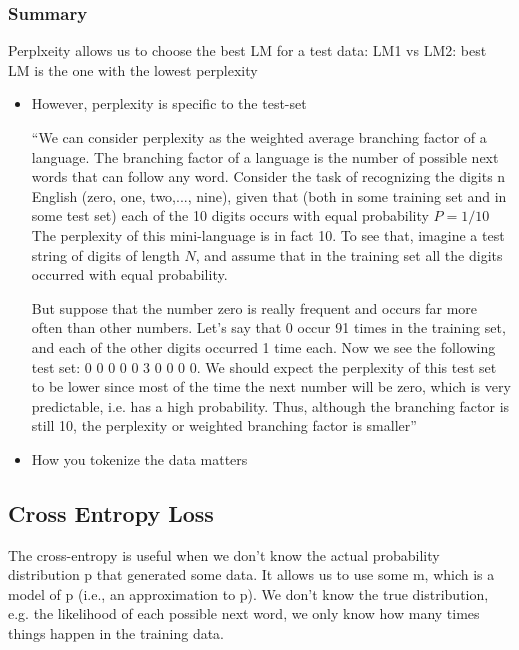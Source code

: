 \documentclass[11pt]{article}
\begin{document}
\subsubsection{Summary}

Perplxeity allows us to choose the best LM for a test data: LM1 vs LM2: best LM is the one with the lowest perplexity
\begin{itemize}
    \item However, perplexity is specific to the test-set
    
    ``We can consider perplexity as the weighted average branching factor of a language. The branching factor of a language is the number of possible next words that can follow any word. Consider the task of recognizing the digits n English (zero, one, two,..., nine), given that (both in some training set and in some test set) each of the 10 digits occurs with equal probability $P=1/10$  The perplexity of this mini-language is in fact 10. To see that, imagine a test string of digits of length $N$, and assume that in the training set all the digits occurred with equal probability. \label{content:weighted-average-branching-factor}

    But suppose that the number zero is really frequent and occurs far more often than other numbers. Let’s say that 0 occur 91 times in the training set, and each of the other digits occurred 1 time each. Now we see the following test set: 0 0 0 0 0 3 0 0 0 0. We should expect the perplexity of this test set to be lower since most of the time the next number will be zero, which is very predictable, i.e. has a high probability. Thus, although the branching factor is still 10, the perplexity or weighted branching factor is smaller''~\cite{book-speech-and-language-processing}

    \item How you tokenize the data matters
\end{itemize}

\subsection{Cross Entropy Loss}

The cross-entropy is useful when we don't know the actual probability distribution p that generated some data. It allows us to use some m, which is a model of p (i.e., an approximation to p). We don't know the true distribution, e.g. the likelihood of each possible next word, we only know how many times things happen in the training data. 
\end{document}
